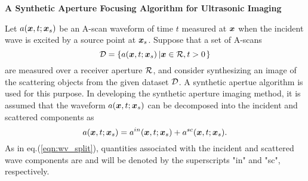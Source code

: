 ﻿\documentclass[11pt,a4j]{article}
\newlength{\minitwocolumn}
\begin{document}
\newcommand{\fat}[1]{\mbox{\boldmath $#1$}}
\newcommand{\D}{\partial}
\newcommand{\w}{\omega}
\newcommand{\ga}{\alpha}
\newcommand{\gb}{\beta}
\newcommand{\gx}{\xi}
\newcommand{\gz}{\zeta}
\newcommand{\vhat}[1]{\hat{\fat{#1}}}
\newcommand{\spc}{\vspace{0.7\baselineskip}}
\newcommand{\halfspc}{\vspace{0.3\baselineskip}}

\newcommand{\twofig}[2]
 {
   \begin{figure}[h]
     \begin{minipage}[t]{\minitwocolumn}
         \begin{center}   #1
         \end{center}
     \end{minipage}
         \hspace{\columnsep}
     \begin{minipage}[t]{\minitwocolumn}
         \begin{center} #2
         \end{center}
     \end{minipage}
   \end{figure}
 }
\begin{center}
{\Large \bf A Synthetic Aperture Focusing Algorithm for Ultrasonic Imaging}
\end{center}
\vspace{10mm}
Let $a(\fat{x},t;\fat{x}_s)$ be an A-scan waveform of time $t$
measured at $\fat{x}$ when the incident wave is excited by a 
 source point at $\fat{x}_s$. 
Suppose that a set of A-scans 
\begin{equation}
	{\cal D} = \left\{
		a(\fat{x},t;\fat{x}_s)\left| \fat{x}\in {\cal R},t>0 \right.
	\right\}
	\label{eqn:bscan_data}
\end{equation}
are measured over a receiver aperture ${\cal R}$, and consider synthesizing an 
image of the scattering objects from the given dataset ${\cal D}$.
A synthetic apertue algorithm is used for this purpose.
In developing the synthetic aperture imaging method, it is assumed that the waveform 
$a(\fat{x},t;\fat{x}_s)$ can be decomposed into the incident and 
scattered components as 
\begin{equation}
	a(\fat{x},t;\fat{x}_s)=
	a^{in}(\fat{x},t;\fat{x}_s)
	+
	a^{sc}(\fat{x},t;\fat{x}_s).
	\label{eqn:wv_split}
\end{equation}
As in eq.(\ref{eqn:wv_split}), quantities associated with the incident and scattered wave 
components are and will be denoted by the superscripts "in" and "sc", respectively.
\end{document}
